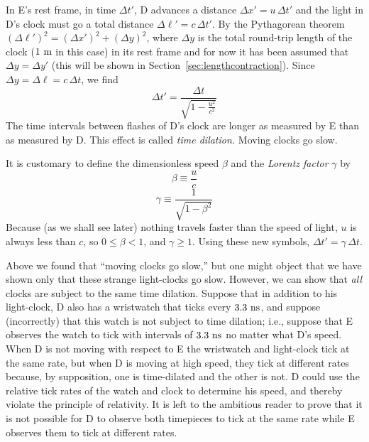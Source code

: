 In E's rest frame, in time $\Delta t'$, D advances a distance $\Delta
x'=u\,\Delta t'$ and the light in D's clock must go a total distance
$\Delta\ell'=c\,\Delta t'$.  By the Pythagorean theorem
$(\Delta\ell')^2=(\Delta x')^2+(\Delta y)^2$, where $\Delta y$ is the
total round-trip length of the clock ($1~{\rm m}$ in this case) in its
rest frame and for now it has been assumed that $\Delta y=\Delta y'$
(this will be shown in Section~\ref{sec:lengthcontraction}).  Since
$\Delta y=\Delta\ell =c\,\Delta t$, we find
\begin{equation}
\Delta t'=\frac{\Delta t}{\sqrt{1-\frac{u^2}{c^2}}}
\end{equation}
The time intervals between flashes of D's clock are longer as
measured by E than as measured by D.  This effect is called {\em time
dilation.\/} Moving clocks go slow.

It is customary to define the dimensionless speed $\beta$ and the {\em
Lorentz factor\/} $\gamma$ by
\begin{equation}
\beta\equiv\frac{u}{c}
\end{equation}
\begin{equation}
\gamma\equiv\frac{1}{\sqrt{1-\beta^2}}
\end{equation}
Because (as we shall see later) nothing travels faster than the speed
of light, $u$ is always less than $c$, so $0\leq\beta <1$, and
$\gamma\geq 1$.  Using these new symbols, $\Delta t'=\gamma\,\Delta
t$.

Above we found that ``moving clocks go slow,'' but one might object
that we have shown only that these strange light-clocks go slow.
However, we can show that {\em all\/} clocks are subject to the same
time dilation.  Suppose that in addition to his light-clock, D also
has a wristwatch that ticks every $3.3~{\rm ns}$, and suppose
(incorrectly) that this watch is not subject to time dilation; i.e.,
suppose that E observes the watch to tick with intervals of $3.3~{\rm
ns}$ no matter what D's speed.  When D is not moving with respect to E
the wristwatch and light-clock tick at the same rate, but when D is
moving at high speed, they tick at different rates because, by
supposition, one is time-dilated and the other is not.  D could use
the relative tick rates of the watch and clock to determine his speed,
and thereby violate the principle of relativity.  It is left to the
ambitious reader to prove that it is not possible for D to observe
both timepieces to tick at the same rate while E observes them to tick
at different rates.

